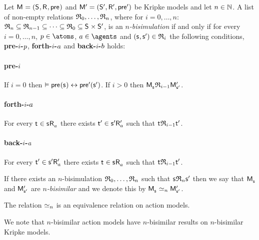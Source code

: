 \begin{definition}[$n$-bisimulation]
Let $\aModelAndTuple$ and $\aModelAndTupleP$ be Kripke models and let $n \in \naturals$.
A list of non-empty relations $\bisimulation_0, \dots, \bisimulation_n$, where for $i = 0, \dots, n$: $\bisimulation_n \subseteq \bisimulation_{n - 1} \subseteq \cdots \subseteq \bisimulation_0 \subseteq \aStates \times \aStatesP$, is an {\em $n$-bisimulation} if and only if for every $i = 0, \dots, n$, $\atomP \in \atoms$, $\agentA \in \agents$ and $(\aStateS, \aStateSP) \in \bisimulation_i$ the following conditions, {\bf pre-$i$-$\atomP$}, {\bf forth-$i$-$\agentA$} and {\bf back-$i$-$\agentB$} holds:

\paragraph{pre-$i$}
If $i = 0$ then $\entails \aPrecondition(\aStateS) \iff \aPreconditionP(\aStateSP)$.
If $i > 0$ then $\aPModel{\aStateS} \bisimulation_{i-1} \aPModelP{\aStateSP}$.

\paragraph{forth-$i$-$\agentA$}
For every $\aStateT \in \aSuccessorsA{\aStateS}$ there exists $\aStateTP \in \aSuccessorsPA{\aStateSP}$ such that $\aStateT \bisimulation_{i - 1} \aStateTP$.

\paragraph{back-$i$-$\agentA$}
For every $\aStateTP \in \aSuccessorsPA{\aStateSP}$ there exists $\aStateT \in \aSuccessorsA{\aStateS}$ such that $\aStateT \bisimulation_{i - 1} \aStateTP$.

If there exists an $n$-bisimulation $\bisimulation_0, \dots, \bisimulation_n$ such that $\aStateS \bisimulation_n \aStateSP$ then we say that $\aPModel{\aStateS}$ and $\aPModelP{\aStateSP}$ are {\em $n$-bisimilar} and we denote this by $\aPModel{\aStateS} \bisimilar[n] \aPModelP{\aStateSP}$.
\end{definition}

\begin{proposition}
The relation $\bisimilar[n]$ is an equivalence relation on action models.
\end{proposition}

We note that $n$-bisimilar action models have $n$-bisimilar results on $n$-bisimilar Kripke models.

